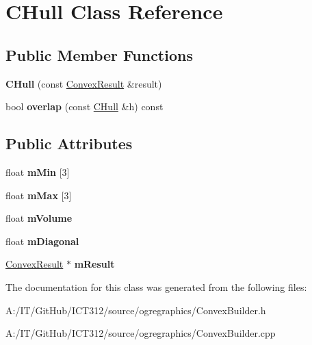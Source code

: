 \hypertarget{class_c_hull}{\section{C\-Hull Class Reference}
\label{class_c_hull}
}
\subsection*{Public Member Functions}
\begin{DoxyCompactItemize}
\item 
\hypertarget{class_c_hull_ac3d6207a87359bb1c0d90e945b28d85b}{{\bfseries C\-Hull} (const \hyperlink{class_convex_decomposition_1_1_convex_result}{Convex\-Result} \&result)}\label{class_c_hull_ac3d6207a87359bb1c0d90e945b28d85b}

\item 
\hypertarget{class_c_hull_a30a0e6b490d7fd5c3d54090ff01304a0}{bool {\bfseries overlap} (const \hyperlink{class_c_hull}{C\-Hull} \&h) const }\label{class_c_hull_a30a0e6b490d7fd5c3d54090ff01304a0}

\end{DoxyCompactItemize}
\subsection*{Public Attributes}
\begin{DoxyCompactItemize}
\item 
\hypertarget{class_c_hull_a7e2b0c242e99ce07586426877428158b}{float {\bfseries m\-Min} \mbox{[}3\mbox{]}}\label{class_c_hull_a7e2b0c242e99ce07586426877428158b}

\item 
\hypertarget{class_c_hull_ae279e2bb3b7b3b3a2a85dadd362f6b62}{float {\bfseries m\-Max} \mbox{[}3\mbox{]}}\label{class_c_hull_ae279e2bb3b7b3b3a2a85dadd362f6b62}

\item 
\hypertarget{class_c_hull_ad8ef82af9ddfbbabc76486aae1c0a8cd}{float {\bfseries m\-Volume}}\label{class_c_hull_ad8ef82af9ddfbbabc76486aae1c0a8cd}

\item 
\hypertarget{class_c_hull_aced64e719b25f3f3fadbccc03c0e3531}{float {\bfseries m\-Diagonal}}\label{class_c_hull_aced64e719b25f3f3fadbccc03c0e3531}

\item 
\hypertarget{class_c_hull_a3c7d7fe1ad593540c4ba27564dae9c69}{\hyperlink{class_convex_decomposition_1_1_convex_result}{Convex\-Result} $\ast$ {\bfseries m\-Result}}\label{class_c_hull_a3c7d7fe1ad593540c4ba27564dae9c69}

\end{DoxyCompactItemize}


The documentation for this class was generated from the following files\-:\begin{DoxyCompactItemize}
\item 
A\-:/\-I\-T/\-Git\-Hub/\-I\-C\-T312/source/ogregraphics/Convex\-Builder.\-h\item 
A\-:/\-I\-T/\-Git\-Hub/\-I\-C\-T312/source/ogregraphics/Convex\-Builder.\-cpp\end{DoxyCompactItemize}
